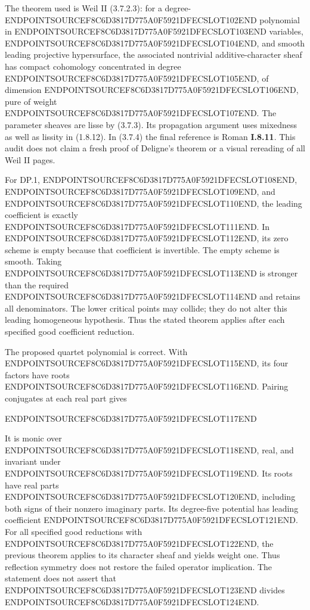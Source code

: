 The theorem used is Weil II (3.7.2.3): for a degree-ENDPOINTSOURCEF8C6D3817D775A0F5921DFECSLOT102END polynomial in ENDPOINTSOURCEF8C6D3817D775A0F5921DFECSLOT103END variables, ENDPOINTSOURCEF8C6D3817D775A0F5921DFECSLOT104END, and smooth leading projective hypersurface, the associated nontrivial additive-character sheaf has compact cohomology concentrated in degree ENDPOINTSOURCEF8C6D3817D775A0F5921DFECSLOT105END, of dimension ENDPOINTSOURCEF8C6D3817D775A0F5921DFECSLOT106END, pure of weight ENDPOINTSOURCEF8C6D3817D775A0F5921DFECSLOT107END. The parameter sheaves are lisse by (3.7.3). Its propagation argument uses mixedness as well as lissity in (1.8.12). In (3.7.4) the final reference is Roman \textbf{I.8.11}. This audit does not claim a fresh proof of Deligne's theorem or a visual rereading of all Weil II pages.

For DP.1, ENDPOINTSOURCEF8C6D3817D775A0F5921DFECSLOT108END, ENDPOINTSOURCEF8C6D3817D775A0F5921DFECSLOT109END, and ENDPOINTSOURCEF8C6D3817D775A0F5921DFECSLOT110END, the leading coefficient is exactly ENDPOINTSOURCEF8C6D3817D775A0F5921DFECSLOT111END. In ENDPOINTSOURCEF8C6D3817D775A0F5921DFECSLOT112END, its zero scheme is empty because that coefficient is invertible. The empty scheme is smooth. Taking ENDPOINTSOURCEF8C6D3817D775A0F5921DFECSLOT113END is stronger than the required ENDPOINTSOURCEF8C6D3817D775A0F5921DFECSLOT114END and retains all denominators. The lower critical points may collide; they do not alter this leading homogeneous hypothesis. Thus the stated theorem applies after each specified good coefficient reduction.

The proposed quartet polynomial is correct. With ENDPOINTSOURCEF8C6D3817D775A0F5921DFECSLOT115END, its four factors have roots ENDPOINTSOURCEF8C6D3817D775A0F5921DFECSLOT116END. Pairing conjugates at each real part gives

ENDPOINTSOURCEF8C6D3817D775A0F5921DFECSLOT117END

It is monic over ENDPOINTSOURCEF8C6D3817D775A0F5921DFECSLOT118END, real, and invariant under ENDPOINTSOURCEF8C6D3817D775A0F5921DFECSLOT119END. Its roots have real parts ENDPOINTSOURCEF8C6D3817D775A0F5921DFECSLOT120END, including both signs of their nonzero imaginary parts. Its degree-five potential has leading coefficient ENDPOINTSOURCEF8C6D3817D775A0F5921DFECSLOT121END. For all specified good reductions with ENDPOINTSOURCEF8C6D3817D775A0F5921DFECSLOT122END, the previous theorem applies to its character sheaf and yields weight one. Thus reflection symmetry does not restore the failed operator implication. The statement does not assert that ENDPOINTSOURCEF8C6D3817D775A0F5921DFECSLOT123END divides ENDPOINTSOURCEF8C6D3817D775A0F5921DFECSLOT124END.


